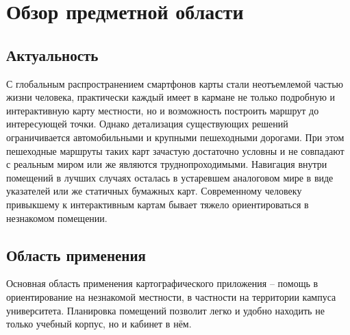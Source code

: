 \chapter{Обзор предметной области}
  \section{Актуальность}
    С глобальным распространением смартфонов карты стали неотъемлемой частью жизни человека, практически каждый имеет в кармане не только подробную и интерактивную карту местности, но и возможность построить маршрут до интересующей точки. Однако детализация существующих решений ограничивается автомобильными и крупными пешеходными дорогами. При этом пешеходные маршруты таких карт зачастую достаточно условны и не совпадают с реальным миром или же являются труднопроходимыми.
    Навигация внутри помещений в лучших случаях осталась в устаревшем аналоговом мире в виде указателей или же статичных бумажных карт. Современному человеку привыкшему к интерактивным картам бывает тяжело ориентироваться в незнакомом помещении.


  \section{Область применения}
    Основная область применения картографического приложения -- помощь в ориентирование на незнакомой местности, в частности на территории кампуса университета. Планировка помещений позволит легко и удобно находить не только учебный корпус, но и кабинет в нём.

